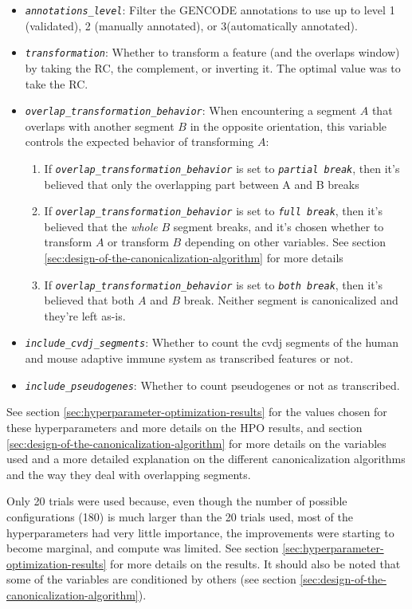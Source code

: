 \documentclass[   ]{article}
\let\oldtexttt\texttt
\renewcommand{\texttt}[1]{\oldtexttt{\itshape #1}}
\begin{document}
\begin{itemize}
	\item \texttt{annotations\_level}: Filter the GENCODE annotations to use up to level 1 (validated), 2 (manually annotated), or 3(automatically annotated).
	\item \texttt{transformation}: Whether to transform a feature (and the
	overlaps window) by taking the RC, the complement, or
	inverting it. The optimal value was to take the RC.
	\item \texttt{overlap\_transformation\_behavior}: When encountering a segment $A$ that overlaps with another segment $B$ in the opposite orientation, this variable controls the expected behavior of transforming $A$:
	\begin{enumerate}
		\item If \texttt{overlap\_transformation\_behavior} is set to \texttt{partial break}, then it's believed that only the overlapping part between A and B breaks
		\item If \texttt{overlap\_transformation\_behavior} is set to \texttt{full break}, then it's believed that the \emph{whole} $B$ segment breaks, and it's chosen whether to transform $A$ or transform $B$ depending on other variables. See section \ref{sec:design-of-the-canonicalization-algorithm} for more details
		\item If \texttt{overlap\_transformation\_behavior} is set to \texttt{both break}, then it's believed that both $A$ and $B$ break. Neither segment is canonicalized and they're left as-is.
	\end{enumerate}
	
	\item \texttt{include\_cvdj\_segments}: Whether to count the
	cvdj segments of the human and mouse adaptive immune system as
	transcribed features or not.
	\item \texttt{include\_pseudogenes}: Whether to count pseudogenes or not as transcribed.
\end{itemize}

See section \ref{sec:hyperparameter-optimization-results} for the values chosen for these hyperparameters and more details on the HPO results, and section \ref{sec:design-of-the-canonicalization-algorithm} for more details on the variables used and a more detailed explanation on the different canonicalization algorithms and the way they deal with overlapping segments.

Only 20 trials were used because, even though the number of possible configurations (180) is much larger than the 20 trials used, most of the hyperparameters had very little importance, the improvements were starting to become marginal, and compute was limited. See section \ref{sec:hyperparameter-optimization-results} for more details on the results. It should also be noted that some of the variables are conditioned by others (see section \ref{sec:design-of-the-canonicalization-algorithm}).
\end{document}
